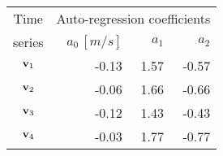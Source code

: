 \begin{tabular}{crrr}
    \toprule
    Time    & \multicolumn{3}{c}{Auto-regression coefficients} \\
    series & $a_0\,[\unit{m/s}]$ & $a_1$ & $a_2$ \\ \otoprule
    $\textbf{v}_{1}$ & -0.13 & 1.57 & -0.57 \\
    $\textbf{v}_{2}$ & -0.06 & 1.66 & -0.66 \\
    $\textbf{v}_{3}$ & -0.12 & 1.43 & -0.43 \\
    $\textbf{v}_{4}$ & -0.03 & 1.77 & -0.77 \\
    \bottomrule
\end{tabular}
